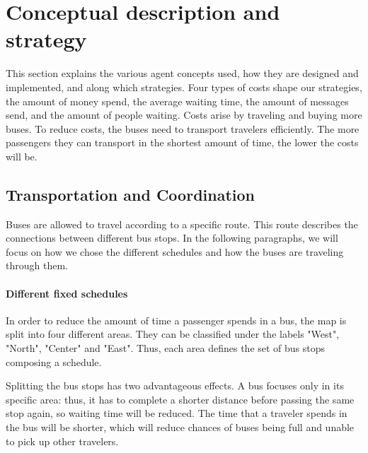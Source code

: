 \section{Conceptual description and strategy}

This section explains the various agent concepts used, how they are designed and implemented, and along which strategies. Four types of costs shape our strategies, the amount of money spend, the average waiting time, the amount of messages send, and the amount of people waiting. Costs arise by traveling and buying more buses. To reduce costs, the buses need to transport travelers efficiently. The more passengers they can transport in the shortest amount of time, the lower the costs will be.

\subsection{Transportation and Coordination}
Buses are allowed to travel according to a specific route. This route describes the connections between different bus stops. In the following paragraphs, we will focus on how we chose the different schedules and how the buses are traveling through them.
 
\paragraph{Different fixed schedules}

In order to reduce the amount of time a passenger spends in a bus, the map is split into four different areas. They can be classified under the labels "West", "North", "Center" and "East". Thus, each area defines the set of bus stops composing a schedule.

Splitting the bus stops has two advantageous effects. A bus focuses only in its specific area: thus, it has to complete a shorter distance before passing the same stop again, so waiting time will be reduced. The time that a traveler spends in the bus will be shorter, which will reduce chances of buses being full and unable to pick up other travelers.

